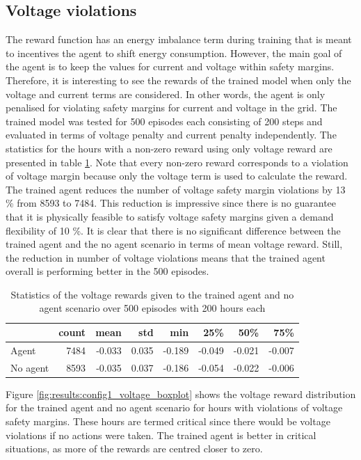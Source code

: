 \documentclass[class=book, crop=false]{standalone}
\begin{document}
\subsection{Voltage violations}
The reward function has an energy imbalance term during training that is meant to incentives the agent to shift energy consumption. However, the main goal of the agent is to keep the values for current and voltage within safety margins. Therefore, it is interesting to see the rewards of the trained model when only the voltage and current terms are considered. In other words, the agent is only penalised for violating safety margins for current and voltage in the grid. The trained model was tested for 500 episodes each consisting of 200 steps and evaluated
in terms of voltage penalty and current penalty independently. The statistics for the hours with a non-zero reward using only voltage reward are presented in table \ref{table:results:configuration1_reward_500_episodes}. Note that every non-zero reward corresponds to a violation of voltage margin because only the voltage term is used to calculate the reward. The trained agent reduces the number of voltage safety margin violations by 13 \% from 8593 to 7484. This reduction is impressive since there is no guarantee that it is physically feasible to satisfy voltage safety margins given a demand flexibility of 10 \%. It is clear that there is no significant difference between the trained agent and the no agent scenario in terms of mean voltage reward. Still, the reduction in number of voltage violations means that the trained agent overall is performing better in the 500 episodes. 
\begin{table}[h]
\center
\begin{tabular}{l|rrrrrrr}
         & count & mean   & std   & min    & 25\%   & 50\%   & 75\%   \\
\hline
Agent    & 7484  & -0.033 & 0.035 & -0.189 & -0.049 & -0.021 & -0.007 \\
No agent & 8593  & -0.035 & 0.037 & -0.186 & -0.054 & -0.022 & -0.006 \\
\hline
\end{tabular}
\caption{Statistics of the voltage rewards given to the trained agent and no agent scenario over 500 episodes with 200 hours each}
\label{table:results:configuration1_reward_500_episodes}
\end{table}

Figure \ref{fig:results:config1_voltage_boxplot} shows the voltage reward distribution for the trained agent and no agent scenario for hours with violations of voltage safety margins. These hours are termed critical since there would be voltage violations if no actions were taken. The trained agent is better in critical situations, as more of the rewards are centred closer to zero.
\end{document}
